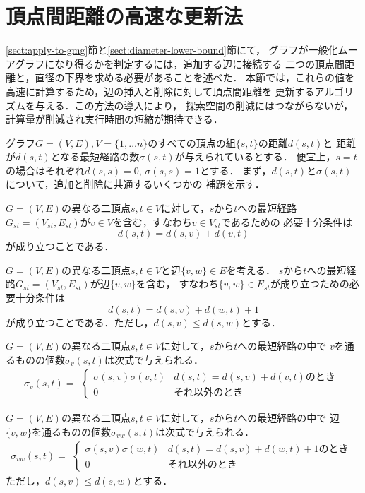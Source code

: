 \section{頂点間距離の高速な更新法}
\label{sect:fast-distance-update}
\ref{sect:apply-to-gmg}節と\ref{sect:diameter-lower-bound}節にて，
グラフが一般化ムーアグラフになり得るかを判定するには，追加する辺に接続する
二つの頂点間距離と，直径の下界を求める必要があることを述べた．
本節では，これらの値を高速に計算するため，辺の挿入と削除に対して頂点間距離を
更新するアルゴリズムを与える．この方法の導入により，
探索空間の削減にはつながらないが，計算量が削減され実行時間の短縮が期待できる．

グラフ$G=(V,E),V=\{1,\ldots n\}$のすべての頂点の組$\{s,t\}$の距離$d(s,t)$と
距離が$d(s,t)$となる最短経路の数$\sigma(s,t)$が与えられているとする．
便宜上，$s=t$の場合はそれぞれ$d(s,s)=0,\,\sigma(s,s)=1$とする．
まず，$d(s,t)$と$\sigma(s,t)$について，追加と削除に共通するいくつかの
補題を示す．
\begin{lemma-without-proof}
  \label{lemma:distance-1}
  $G=(V,E)$の異なる二頂点$s,t\in V$に対して，$s$から$t$への最短経路
  $G_{st}=(V_{st},E_{st})$が$v\in V$を含む，すなわち$v\in V_{st}$であるための
  必要十分条件は
  \[ d(s,t)=d(s,v)+d(v,t) \]
  が成り立つことである．
\end{lemma-without-proof}
\begin{lemma-without-proof}
  \label{lemma:distance-2}
  $G=(V,E)$の異なる二頂点$s,t\in V$と辺$\{v,w\}\in E$を考える．
  $s$から$t$への最短経路$G_{st}=(V_{st},E_{st})$が辺$\{v,w\}$を含む，
  すなわち$\{v,w\}\in E_{st}$が成り立つための必要十分条件は
  \[ d(s,t)=d(s,v)+d(w,t)+1 \]
  が成り立つことである．ただし，$d(s,v)\leq d(s,w)$とする．
\end{lemma-without-proof}
\begin{lemma-without-proof}
  \label{lemma:path-num-1}
  $G=(V,E)$の異なる二頂点$s,t\in V$に対して，$s$から$t$への最短経路の中で
  $v$を通るものの個数$\sigma_v(s,t)$は次式で与えられる．
  \[ \sigma_v(s,t)=\begin{aligned}\begin{cases}
    \sigma(s,v)\sigma(v,t) & d(s,t)=d(s,v)+d(v,t)\text{のとき} \\
    0 & \text{それ以外のとき}
  \end{cases}\end{aligned} \]
\end{lemma-without-proof}
\begin{lemma-without-proof}
  \label{lemma:path-num-2}
  $G=(V,E)$の異なる二頂点$s,t\in V$に対して，$s$から$t$への最短経路の中で
  辺$\{v,w\}$を通るものの個数$\sigma_{vw}(s,t)$は次式で与えられる．
  \[ \sigma_{vw}(s,t)=\begin{aligned}\begin{cases}
    \sigma(s,v)\sigma(w,t) & d(s,t)=d(s,v)+d(w,t)+1\text{のとき} \\
    0 & \text{それ以外のとき}
  \end{cases}\end{aligned} \]
  ただし，$d(s,v)\leq d(s,w)$とする．
\end{lemma-without-proof}

